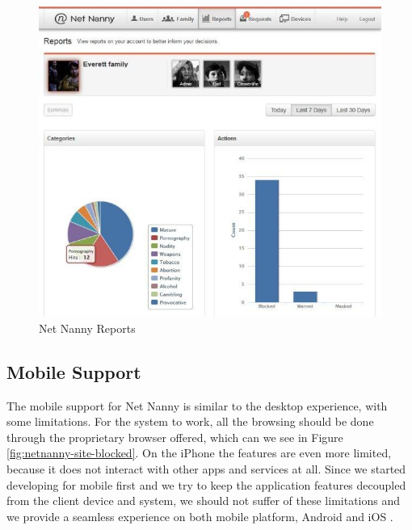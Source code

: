 \begin{figure}[th]
\centering
\includegraphics[width=1\textwidth]{Figures/netnanny-summary-report}
\decoRule
\caption{Net Nanny Reports}
\label{fig:netnanny-summary-report}
\end{figure}

\subsection{Mobile Support}

The mobile support for Net Nanny is similar to the desktop experience, with some limitations. For the system to work, all the browsing should be done through the proprietary browser offered, which can we see in Figure \ref{fig:netnanny-site-blocked}. On the iPhone the features are even more limited, because it does not interact with other apps and services at all. Since we started developing for mobile first and we try to keep the application features decoupled from the client device and system, we should not suffer of these limitations and we provide a seamless experience on both mobile platform, Android and iOS \citep{netNannyPCMag}.


